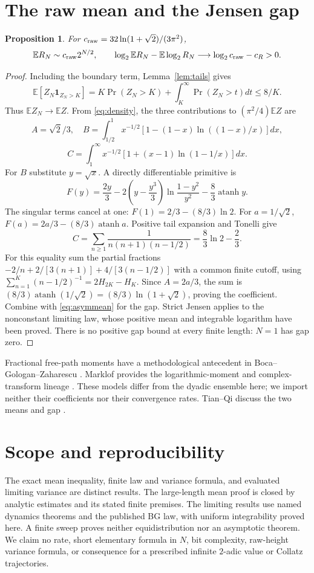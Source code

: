 \documentclass[11pt,a4paper]{article}
\numberwithin{equation}{section}
\newtheorem{proposition}[theorem]{Proposition}
\theoremstyle{remark}
\newcommand{\E}{\mathbb E}
\begin{document}
\section{The raw mean and the Jensen gap}\label{sec:raw}
\begin{proposition}\label{prop:raw}
For $c_{\rm raw}=32\ln(1+\sqrt2)/(3\pi^2)$,
\[
\E R_N\sim c_{\rm raw}2^{N/2},\qquad
\log_2\E R_N-\E\log_2R_N\longrightarrow\log_2c_{\rm raw}-c_R>0.
\]
\end{proposition}
\begin{proof}
Including the boundary term, Lemma~\ref{lem:tails} gives
\[
\E[Z_N\mathbf1_{Z_N>K}]
=K\Pr(Z_N>K)+\int_K^\infty\Pr(Z_N>t)dt\le8/K.
\]
Thus $\E Z_N\to\E Z$. From \eqref{eq:density}, the three contributions
to $(\pi^2/4)\E Z$ are
\[
A=\sqrt2/3,\quad B=\int_{1/2}^1x^{-1/2}[1-(1-x)\ln((1-x)/x)]dx,
\]
\[
C=\int_1^\infty x^{-1/2}[1+(x-1)\ln(1-1/x)]dx.
\]
For $B$ substitute $y=\sqrt x$. A directly differentiable primitive is
\[
F(y)=\frac{2y}3-2\left(y-\frac{y^3}3\right)
\ln\frac{1-y^2}{y^2}-\frac83\operatorname{atanh}y.
\]
The singular terms cancel at one:
$F(1)=2/3-(8/3)\ln2$. For $a=1/\sqrt2$,
$F(a)=2a/3-(8/3)\operatorname{atanh}a$.
Positive tail expansion and Tonelli give
\[
C=\sum_{n\ge1}\frac1{n(n+1)(n-1/2)}=\frac83\ln2-\frac23.
\]
For this equality sum the partial fractions
$-2/n+2/[3(n+1)]+4/[3(n-1/2)]$ with a common finite cutoff, using
$\sum_{n=1}^K(n-1/2)^{-1}=2H_{2K}-H_K$.
Since $A=2a/3$, the sum is $(8/3)\operatorname{atanh}(1/\sqrt2)
=(8/3)\ln(1+\sqrt2)$, proving the coefficient.
Combine with \eqref{eq:asymmean} for the gap. Strict Jensen applies
to the nonconstant limiting law, whose positive mean and integrable
logarithm have been proved. There is no positive gap bound at every
finite length: $N=1$ has gap zero.
\end{proof}

Fractional free-path moments have a methodological antecedent in
Boca--Gologan--Zaharescu
\cite[Theorem~1.1, p.~304; Theorem~1.2 and Corollary~1.3, p.~305]{BGZ}.
Marklof provides the logarithmic-moment and complex-transform lineage
\cite{MarklofLog}. These models differ from the dyadic ensemble here;
we import neither their coefficients nor their convergence rates.
Tian--Qi discuss the two means and gap \cite[p.~78, Table~1]{TQ}.

\section{Scope and reproducibility}\label{sec:scope}
The exact mean inequality, finite law and variance formula, and
evaluated limiting variance are distinct results. The large-length
mean proof is closed by analytic estimates and its stated finite
premises. The limiting results use named dynamics theorems and the
published BG law, with uniform integrability proved here. A finite
sweep proves neither equidistribution nor an asymptotic theorem.
We claim no rate, short elementary formula in $N$, bit complexity,
raw-height variance formula, or consequence for a prescribed infinite
$2$-adic value or Collatz trajectories.
\end{document}
